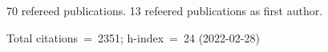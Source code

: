 70 refereed publications. 13 refeered publications as first author.

Total citations~=~2351; h-index~=~24 (2022-02-28)